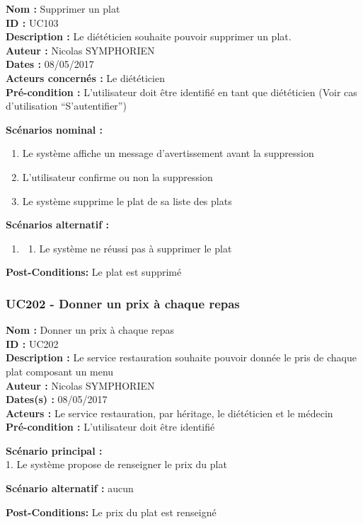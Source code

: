 \noindent\textbf{Nom :} Supprimer un plat\\
\textbf{ID :} UC103\\
\textbf{Description :} Le diététicien souhaite pouvoir supprimer un
plat.\\
\textbf{Auteur :} Nicolas SYMPHORIEN\\
\textbf{Dates :} 08/05/2017\\
\textbf{Acteurs concernés :} Le diététicien\\
\textbf{Pré-condition :} L'utilisateur doit être identifié en tant que
diététicien (Voir cas d'utilisation ``S'autentifier'')

\textbf{Scénarios nominal :}

\begin{enumerate}
\def\labelenumi{\arabic{enumi}.}
\item
  Le système affiche un message d'avertissement avant la suppression
\item
  L'utilisateur confirme ou non la suppression
\item
  Le système supprime le plat de sa liste des plats
\end{enumerate}

\textbf{Scénarios alternatif :}

\begin{enumerate}
\def\labelenumi{\arabic{enumi}.}
\setcounter{enumi}{2}
\item
  \begin{enumerate}
  \def\labelenumii{\alph{enumii}.}
  \item
    Le système ne réussi pas à supprimer le plat
  \end{enumerate}
\end{enumerate}

\textbf{Post-Conditions:} Le plat est supprimé

\subsubsection{UC202 - Donner un prix à chaque
repas}\label{uc202---donner-un-prix-uxe0-chaque-repas}

\noindent\textbf{Nom :} Donner un prix à chaque repas\\
\textbf{ID :} UC202\\
\textbf{Description :} Le service restauration souhaite pouvoir donnée
le pris de chaque plat composant un menu\\
\textbf{Auteur :} Nicolas SYMPHORIEN\\
\textbf{Dates(s) :} 08/05/2017\\
\textbf{Acteurs :} Le service restauration, par héritage, le diététicien
et le médecin\\
\textbf{Pré-condition :} L'utilisateur doit être identifié

\textbf{Scénario principal :}\\
1. Le système propose de renseigner le prix du plat

\textbf{Scénario alternatif :} aucun

\textbf{Post-Conditions:} Le prix du plat est renseigné
